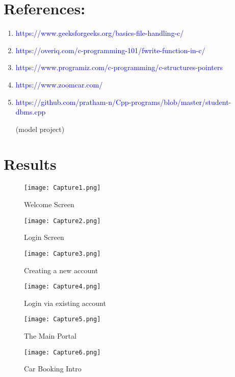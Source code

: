 \documentclass[12pt]{article}
\begin{document}
\section{References:}
\begin{enumerate}
    \item \textcolor{blue}{https://www.geeksforgeeks.org/basics-file-handling-c/}
    \item \textcolor{blue}{https://overiq.com/c-programming-101/fwrite-function-in-c/}
    \item \textcolor{blue}{https://www.programiz.com/c-programming/c-structures-pointers}
    \item \textcolor{blue}{https://www.zoomcar.com/}
    \item \textcolor{blue}{https://github.com/pratham-n/Cpp-programs/blob/master/student-dbms.cpp}
    
    (model project) 
\end{enumerate}

\newpage            %
\section{Results}   %

\begin{figure}[h!]
    \centering
    \texttt{[image: Capture1.png]} %
    \caption{Welcome Screen}
    
    \texttt{[image: Capture2.png]}
    \caption{Login Screen}
\end{figure}

\newpage
\begin{figure}[h!]
    \centering
    \texttt{[image: Capture3.png]} 
    \caption{Creating a new account}
    
    \texttt{[image: Capture4.png]} 
    \caption{Login via existing account}
\end{figure}

\newpage
\begin{figure}[h!]
    \centering
    \texttt{[image: Capture5.png]} 
    \caption{The Main Portal}
    \texttt{[image: Capture6.png]} 
    \caption{Car Booking Intro}
\end{figure}
\end{document}
